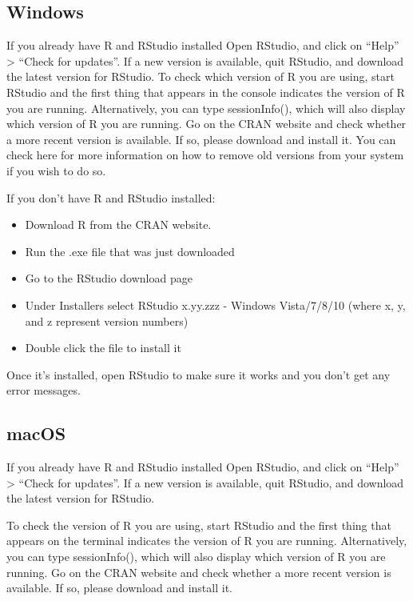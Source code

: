 \documentclass[]{book}
\providecommand{\tightlist}{%
  \setlength{\itemsep}{0pt}\setlength{\parskip}{0pt}}
\begin{document}
\subsection{Windows}\label{windows}

If you already have R and RStudio installed Open RStudio, and click on
``Help'' \textgreater{} ``Check for updates''. If a new version is
available, quit RStudio, and download the latest version for RStudio. To
check which version of R you are using, start RStudio and the first
thing that appears in the console indicates the version of R you are
running. Alternatively, you can type sessionInfo(), which will also
display which version of R you are running. Go on the CRAN website and
check whether a more recent version is available. If so, please download
and install it. You can check here for more information on how to remove
old versions from your system if you wish to do so.

If you don't have R and RStudio installed:

\begin{itemize}
\tightlist
\item
  Download R from the CRAN website.
\item
  Run the .exe file that was just downloaded
\item
  Go to the RStudio download page
\item
  Under Installers select RStudio x.yy.zzz - Windows Vista/7/8/10 (where
  x, y, and z represent version numbers)
\item
  Double click the file to install it
\end{itemize}

Once it's installed, open RStudio to make sure it works and you don't
get any error messages.

\subsection{macOS}\label{macos}

If you already have R and RStudio installed Open RStudio, and click on
``Help'' \textgreater{} ``Check for updates''. If a new version is
available, quit RStudio, and download the latest version for RStudio.

To check the version of R you are using, start RStudio and the first
thing that appears on the terminal indicates the version of R you are
running. Alternatively, you can type sessionInfo(), which will also
display which version of R you are running. Go on the CRAN website and
check whether a more recent version is available. If so, please download
and install it.
\end{document}
